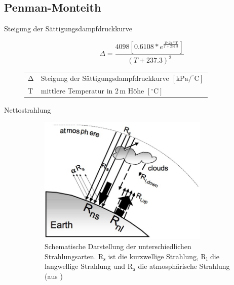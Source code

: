 \begin{appendix}

\section{Penman-Monteith}
\label{sec:penman}

\begin{description}
\item[Steigung der Sättigungsdampfdruckkurve]
\begin{equation}
\label{eq:delta}
\Delta=\frac{4098\left[0.6108*e^{\frac{17.27*T}{T+237.3}}\right]}{\left(T+237.3\right)^2}
\end{equation}
\begin{table}[H]
\centering
\begin{tabular}{ll}
$\mathrm{\Delta}$ & Steigung der Sättigungsdampfdruckkurve $\mathrm{[kPa/^{\circ}C]}$\\
T & mittlere Temperatur in 2\,m Höhe $\mathrm{[^{\circ}C]}$\\
\end{tabular}
\end{table}

\item[Nettostrahlung]

\begin{figure}[H]
\centering
\includegraphics[width=0.8\textwidth]{figures/strahlung.jpg}
\caption{Schematische Darstellung der unterschiedlichen Strahlungsarten. $\mathrm{R_{s}}$ ist die kurzwellige Strahlung, $\mathrm{R_{l}}$ die langwellige Strahlung und $\mathrm{R_{a}}$ die atmosphärische Strahlung (aus \cite{fao})}
\label{fig:strahlung}
\end{figure}


\end{description}
\end{appendix}
